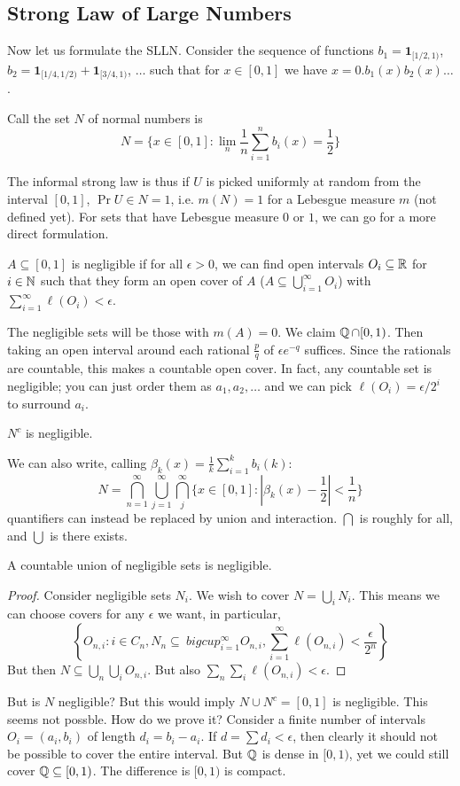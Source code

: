 \subsection{Strong Law of Large Numbers}
Now let us formulate the SLLN. Consider the sequence of functions $b_1 = \mathbf{1}_{[1/2, 1)}$, $b_2 = \mathbf{1}_{[1/4, 1/2)} + \mathbf{1}_{[3/4, 1)}$, $\dots$
such that for $x \in [0, 1]$ we have $x = 0.b_1(x) b_2(x) \dots$.
\begin{definition}
Call the set $N$ of normal numbers is
\[ N = \{x \in [0, 1] : \lim_n \frac{1}{n} \sum_{i = 1}^n b_i(x) = \frac12\} \]
\end{definition}
The informal strong law is thus if $U$ is picked uniformly at random from the interval $[0, 1]$,
$\Pr{U \in N} = 1$, i.e. $m(N) = 1$ for a Lebesgue measure $m$ (not defined yet). For sets that have Lebesgue measure
$0$ or $1$, we can go for a more direct formulation.
\begin{definition}
    $A \subseteq [0, 1]$ is negligible if for all $\epsilon > 0$, we can find open intervals $O_i \subseteq \operatorname{\mathbb{R}}$ for $i \in \operatorname{\mathbb{N}}$ such that they
    form an open cover of $A$ ($A \subseteq \bigcup_{i = 1}^{\infty} O_i$) with $\sum_{i = 1}^{\infty} \ell(O_i) < \epsilon$.
\end{definition}
The negligible sets will be those with $m(A) = 0$. We claim $\operatorname{\mathbb{Q}} \cap [0, 1)$. Then taking an open interval around each rational $\frac{p}{q}$
of 
$\epsilon e^{-q}$ suffices. Since the rationals are countable, this makes a countable open cover. In fact, any countable set
is negligible; you can just order them as $a_1, a_2, \dots$ and we can pick $\ell(O_i) = \epsilon/2^i$ to surround $a_i$.
\begin{theorem}
    $N^c$ is negligible.
\end{theorem}
We can also write, calling $\beta_k(x) = \frac{1}{k} \sum_{i = 1}^k b_i(k)$:
\[ N = \bigcap_{n = 1}^{\infty} \bigcup_{j = 1}^{\infty} \bigcap_{j}^{\infty} \{ x \in [0, 1] : |\beta_k(x) - \frac{1}{2}| < \frac{1}{n} \}\]
quantifiers can instead be replaced by union and interaction. $\bigcap$ is roughly for all, and $\bigcup$ is there exists.
\begin{theorem}
    A countable union of negligible sets is negligible.
    \begin{proof}
        Consider negligible sets $N_i$. We wish to cover $N = \bigcup_i N_i$.
        This means we can choose covers for any $\epsilon$ we want, in particular,
        \[ \left\{ O_{n, i} : i \in C_n, N_n \subseteq \ bigcup_{i = 1}^{\infty} O_{n, i}, \sum_{i = 1}^{\infty} \ell(O_{n, i}) < \frac{\epsilon}{2^n} \right\} \]
        But then $N \subseteq \bigcup_n \bigcup_i O_{n, i}$. But also $\sum_{n} \sum_{i} \ell(O_{n, i}) < \epsilon$.
    \end{proof}
\end{theorem}
But is $N$ negligible? But this would imply $N \cup N^c = [0, 1]$ is negligible. This seems
not possble. How do we prove it? Consider a finite number of intervals $O_i = (a_i, b_i)$ of length $d_i = b_i - a_i$.
If $d = \sum d_i < \epsilon$, then clearly it should not be possible to cover the entire interval. But $\operatorname{\mathbb{Q}}$ is dense in $[0, 1)$,
yet we could still cover $\operatorname{\mathbb{Q}} \subseteq [0, 1)$. The difference is $[0, 1)$ is compact.
